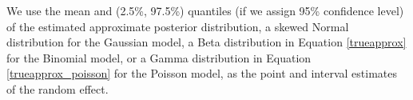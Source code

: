 \documentclass[article]{jss}
\begin{document}

We use the  mean and (2.5\%, 97.5\%) quantiles (if we assign 95\% confidence level) of the estimated approximate posterior distribution, a skewed Normal distribution for the Gaussian model, a Beta distribution in Equation \ref{trueapprox} for the Binomial model, or a Gamma distribution in Equation \ref{trueapprox_poisson} for the Poisson model, as the point and interval estimates of the random effect.










\end{document}
